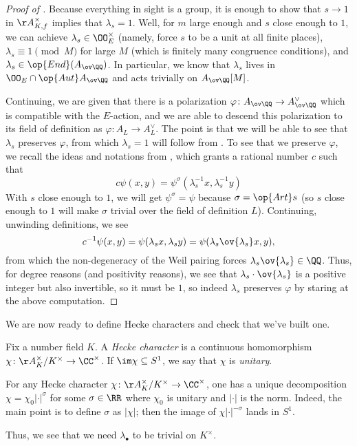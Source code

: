 \documentclass[../notes.tex]{subfiles}
\begin{document}
\begin{proof}[Proof of ]
	Because everything in sight is a group, it is enough to show that $s\to1$ in $\AA_{K,f}^\times$ implies that $\lambda_s=1$. Well, for $m$ large enough and $s$ close enough to $1$, we can achieve $\lambda_s\in\OO_E^\times$ (namely, force $s$ to be a unit at all finite places), $\lambda_s\equiv1\pmod M$ for large $M$ (which is finitely many congruence conditions), and $\lambda_s\in\op{End}(A_{\ov\QQ})$. In particular, we know that $\lambda_s$ lives in $\OO_E\cap\op{Aut}A_{\ov\QQ}$ and acts trivially on $A_{\ov\QQ}[M]$.

	Continuing, we are given that there is a polarization $\varphi\colon A_{\ov\QQ}\to A_{\ov\QQ}^\lor$ which is compatible with the $E$-action, and we are able to descend this polarization to its field of definition as $\varphi\colon A_L\to A_L^\lor$. The point is that we will be able to see that $\lambda_s$ preserves $\varphi$, from which $\lambda_s=1$ will follow from . To see that we preserve $\varphi$, we recall the ideas and notations from , which grants a rational number $c$ such that
	\[c\psi(x,y)=\psi^\sigma\left(\lambda_s^{-1}x,\lambda_s^{-1}y\right)\]
	With $s$ close enough to $1$, we will get $\psi^\sigma=\psi$ because $\sigma=\op{Art}s$ (so $s$ close enough to $1$ will make $\sigma$ trivial over the field of definition $L$). Continuing, unwinding definitions, we see
	\[c^{-1}\psi(x,y)=\psi(\lambda_sx,\lambda_sy)=\psi(\lambda_s\ov{\lambda_s}x,y),\]
	from which the non-degeneracy of the Weil pairing forces $\lambda_s\ov{\lambda_s}\in\QQ$. Thus, for degree reasons (and positivity reasons), we see that $\lambda_s\cdot\ov{\lambda_s}$ is a positive integer but also invertible, so it must be $1$, so indeed $\lambda_s$ preserves $\varphi$ by staring at the above computation.
\end{proof}
We are now ready to define Hecke characters and check that we've built one.
\begin{definition}
	Fix a number field $K$. A \textit{Hecke character} is a continuous homomorphism $\chi\colon\AA_K^\times/K^\times\to\CC^\times$. If $\im\chi\subseteq S^1$, we say that $\chi$ is \textit{unitary}.
\end{definition}
\begin{remark}
	For any Hecke character $\chi\colon\AA_K^\times/K^\times\to\CC^\times$, one has a unique decomposition $\chi=\chi_0\left|\cdot\right|^\sigma$ for some $\sigma\in\RR$ where $\chi_0$ is unitary and $\left|\cdot\right|$ is the norm. Indeed, the main point is to define $\sigma$ as $\left|\chi\right|$; then the image of $\chi\left|\cdot\right|^{-\sigma}$ lands in $S^1$.
\end{remark}
Thus, we see that we need $\lambda_\bullet$ to be trivial on $K^\times$.
\end{document}
